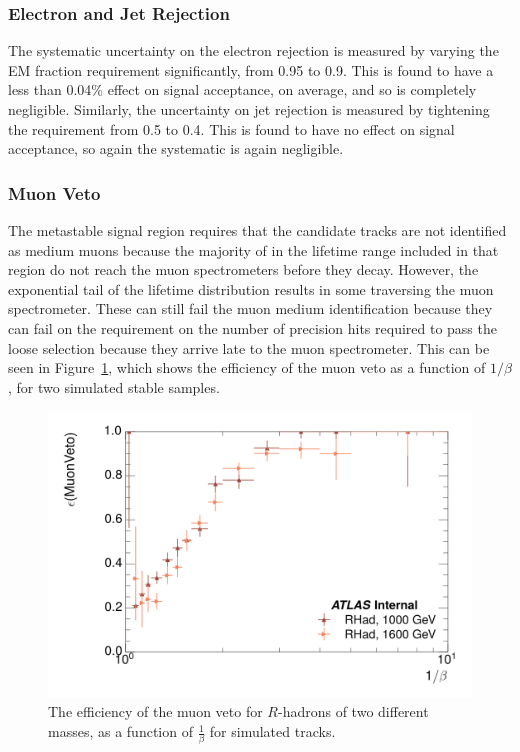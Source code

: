 \subsubsection{Electron and Jet Rejection}
The systematic uncertainty on the electron rejection is measured by varying the EM fraction requirement significantly, from 0.95 to 0.9. 
This is found to have a less than 0.04\% effect on signal acceptance, on average, and so is completely negligible. Similarly, the uncertainty on jet rejection is measured by tightening the \ep requirement from 0.5 to 0.4. 
This is found to have no effect on signal acceptance, so again the systematic is again negligible.

\subsubsection{Muon Veto}
The metastable signal region requires that the candidate tracks are not identified as medium muons because the majority of \rhadrons in the lifetime range included in that region do not reach the muon spectrometers before they decay. 
However, the exponential tail of the \rhadron lifetime distribution results in some \rhadrons traversing the muon spectrometer. 
These can still fail the muon medium identification because they can fail on the requirement on the number of precision hits required to pass the loose selection because they arrive late to the muon spectrometer.
This can be seen in Figure~\ref{fig:muonVeto_eff}, which shows the efficiency of the muon veto as a function of $1/\beta$, for two simulated stable \rhadron samples.

\begin{figure}[hbtp]
\centering
\includegraphics[width=\fullfig]{figures/veff_invbeta.png}
\caption{The efficiency of the muon veto for $R$-hadrons of two different masses, as a function of $\frac{1}{\beta}$ for simulated \rhadron tracks.}
\label{fig:muonVeto_eff}
\end{figure}

